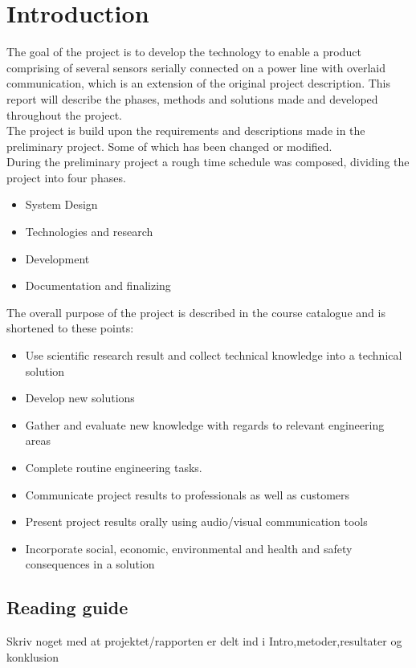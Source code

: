\chapter{Introduction}

The goal of the project is to develop the technology to enable a product comprising of several sensors serially connected on a power line with overlaid communication, which is an extension of the original project description. This report will describe the phases, methods and solutions made and developed throughout the project.\\

The project is build upon the requirements and descriptions made in the preliminary project. Some of which has been changed or modified.\\

During the preliminary project a rough time schedule was composed, dividing the project into four phases.

\begin{itemize}
	\item System Design
	\item Technologies and research
	\item Development
	\item Documentation and finalizing
\end{itemize}

The overall purpose of the project is described in the course catalogue and is shortened to these points:

\begin{itemize}
	\item Use scientific research result and collect technical knowledge into a technical solution
	\item Develop new solutions
	\item Gather and evaluate new knowledge with regards to relevant engineering areas
	\item Complete routine engineering tasks.
	\item Communicate project results to professionals as well as customers
	\item Present project results orally using audio/visual communication tools
	\item Incorporate social, economic, environmental and health and safety consequences in a solution	
\end{itemize}

\section{Reading guide}
Skriv noget med at projektet/rapporten er delt ind i Intro,metoder,resultater og konklusion

